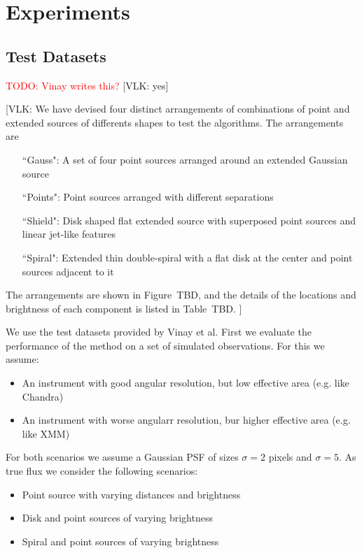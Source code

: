\documentclass[twocolumn]{aastex631}
\newcommand{\todo}[1]{\textcolor{red}{TODO: #1}\PackageWarning{TODO:}{#1!}}
\newcommand{\vlk}[1]{{\color{blue} [VLK: #1]}}
\begin{document}
    
    \section{Experiments}
    \subsection{Test Datasets}
    \todo{Vinay writes this?}
    \vlk{yes}

    \vlk{We have devised four distinct arrangements of combinations of point and extended sources of differents shapes to test the algorithms.  The arrangements are 
    \begin{itemize}
        \item[ ``Gauss":] A set of four point sources arranged around an extended Gaussian source
        \item[``Points":] Point sources arranged with different separations
        \item[``Shield":] Disk shaped flat extended source with superposed point sources and linear jet-like features
        \item[``Spiral":] Extended thin double-spiral with a flat disk at the center and point sources adjacent to it
    \end{itemize}
    The arrangements are shown in Figure~TBD, and the details of the locations and brightness of each component is listed in Table~TBD.
    }

    We use the test datasets provided by Vinay et al.
    First we evaluate the performance of the method on a set of simulated observations.
    For this we assume:

    \begin{itemize}
        \item An instrument with good angular resolution, but low effective area (e.g. like Chandra)
        \item An instrument with worse angularr resolution, bur higher effective area (e.g. like XMM)
    \end{itemize}

    For both scenarios we assume a Gaussian PSF of sizes $\sigma = 2$ pixels and  $\sigma = 5$.
    As true flux we consider the following scenarios:

    \begin{itemize}
        \item Point source with varying distances and brightness
        \item Disk and point sources of varying brightness
        \item Spiral and point sources of varying brightness
    \end{itemize}
\end{document}
